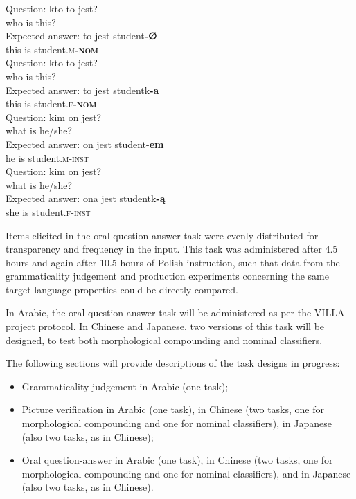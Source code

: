 \documentclass[output=paper,colorlinks,citecolor=brown,modfonts,nonflat]{../langscibook}
\begin{document}
\ea%
    \label{ex:watorek:4}
    \ea%
    \label{ex:watorek:4a}
    \gll    Question: kto to jest?\\
            {} who is this?\\
    \ex%
    \label{ex:watorek:4b}
    \gll    Expected answer: to jest student\textbf{-∅}\\
            {} {} this is student\textsc{.m\textbf{-nom}}\\
    \ex%
    \label{ex:watorek:4c}
    \gll    Question: kto to jest?\\
            {} who is this?\\
    \ex%
    \label{ex:watorek:4d}
    \gll    Expected answer: to jest studentk\textbf{{-a}}\\
            {} {} this is student\textsc{.f\textbf{-nom}}\\
    \ex%
    \label{ex:watorek:4e}
    \gll    Question: kim on jest?\\
            {} what is he/she?\\
    \ex%
    \label{ex:watorek:4f}
    \gll    Expected answer: on jest student-\textbf{{em}}\\
            {} {} he is student\textsc{.m-inst}\\
    \ex%
    \label{ex:watorek:4g}
    \gll    Question: kim on jest?\\
            {} what is he/she?\\
    \ex%
    \label{ex:watorek:4h}
    \gll    Expected answer: ona jest studentk\textbf{{-ą}}\\
            {} {} she is student\textsc{.f-inst}\\
    \z
\z

Items elicited in the oral question-answer task were evenly distributed for transparency and frequency in the input. This task was administered after 4.5 hours and again after 10.5 hours of Polish instruction, such that data from the grammaticality judgement and production experiments concerning the same target language properties could be directly compared. 

In Arabic, the oral question-answer task will be administered as per the VILLA project protocol. In Chinese and Japanese, two versions of this task will be designed, to test both morphological compounding and nominal classifiers.

The following sections will provide descriptions of the task designs in progress:

\begin{itemize}
    \item Grammaticality judgement in Arabic (one task);
    \item Picture verification in Arabic (one task), in Chinese (two tasks, one for morphological compounding and one for nominal classifiers), in Japanese (also two tasks, as in Chinese);
    \item Oral question-answer in Arabic (one task), in Chinese (two tasks, one for morphological compounding and one for nominal classifiers), and in Japanese (also two tasks, as in Chinese).
\end{itemize}
\end{document}

